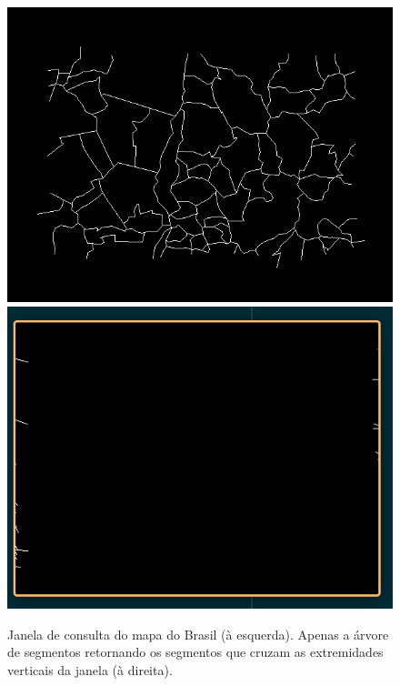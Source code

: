 \begin{figure}[ht]
    \centering
    \includegraphics[scale=0.3]{images/Captura de tela de 2021-04-03 19-25-10.png}
    \includegraphics[scale=0.35]{images/Captura de tela de 2021-04-01 12-10-49.png}
    \caption{Janela de consulta do mapa do Brasil (à esquerda). Apenas a árvore de segmentos retornando os segmentos que cruzam as extremidades verticais da janela (à direita).}
    \label{fig:execut1}
\end{figure}


